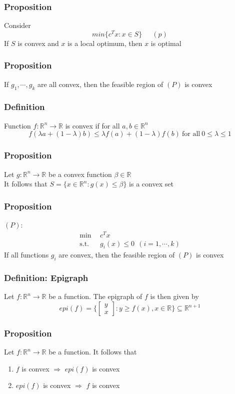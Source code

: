 \documentclass[11pt]{article}
\newcommand{\R}{{\mathbb{R}}}
\newcommand{\cv}[1]{\begin{bmatrix} #1 \end{bmatrix}}
\begin{document}
\subsubsection{Proposition}
Consider \[min\{c^Tx:x\in S\}\ \ \quad(p)\]
If $S$ is convex and $x$ is a local optimum, then $x$ is optimal
\subsubsection{Proposition}
If $g_1,\cdots,g_k$ are all convex, then the feasible region of $(P)$ is convex
\subsubsection{Definition}
Function $f:\R^n\rightarrow\R$ is convex if for all $a,b\in\R^n$
\[f(\lambda a+(1-\lambda)b)\leq \lambda f(a) + (1-\lambda)f(b)\ \text{for all}\ 0\leq\lambda\leq1\]
\subsubsection{Proposition}
Let $g:\R^n\rightarrow\R$ be a convex function $\beta\in\R$ \\
It follows that $S=\{x\in\R^n:g(x)\leq\beta\}$ is a convex set 
\subsubsection{Proposition}
$(P)$:
\begin{align*}
  \text{min}\ \ &c^Tx \ \quad\\
  \text{s.t.}\ \ &g_i(x)\leq 0\ \ (i=1,\cdots,k)
\end{align*}
If all functions $g_i$ are convex, then the feasible region of $(P)$ is convex 
\subsubsection{Definition: Epigraph}
Let $f:\R^n\rightarrow\R$ be a function. The epigraph of $f$ is then given by 
\[epi(f) = \{\cv{y\\x}:y\geq f(x), x\in\R\}\subseteq\R^{n+1}\]
\subsubsection{Proposition}
Let $f:\R^n\rightarrow\R$ be a function. It follows that 
\begin{enumerate}
  \item $f$ is convex $\Rightarrow$ $epi(f)$ is convex 
  \item $epi(f)$ is convex $\Rightarrow$ $f$ is convex 
\end{enumerate}
\end{document}
